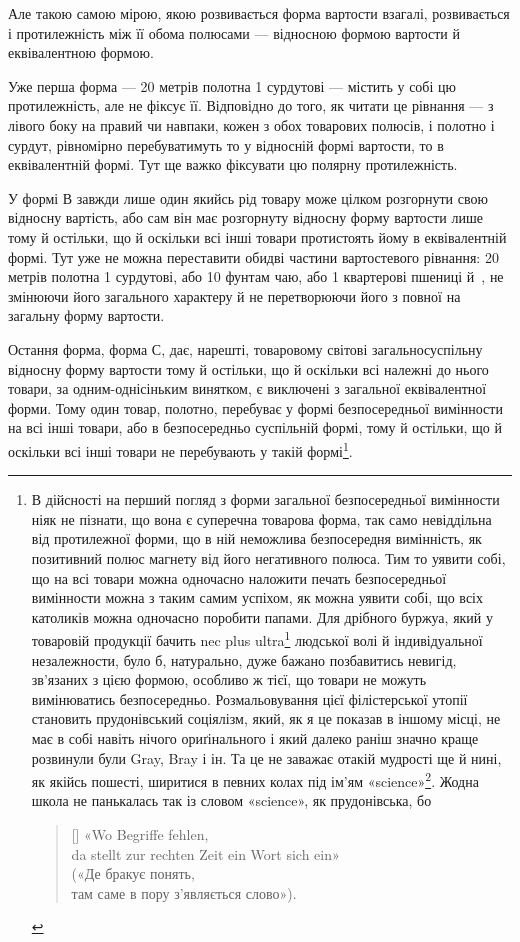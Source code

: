 Але такою самою мірою, якою розвивається форма вартости
взагалі, розвивається і протилежність між її обома полюсами —
відносною формою вартости й еквівалентною формою.

Уже перша форма — 20 метрів полотна \deq{} 1 сурдутові —
містить у собі цю протилежність, але не фіксує її. Відповідно до
того, як читати це рівнання — з лівого боку на правий чи навпаки,
кожен з обох товарових полюсів, і полотно і сурдут, рівномірно
перебуватимуть то у відносній формі вартости, то в еквівалентній
формі. Тут ще важко фіксувати цю полярну протилежність.

У формі В завжди лише один якийсь рід товару може цілком
розгорнути свою відносну вартість, або сам він має розгорнуту
відносну форму вартости лише тому й остільки, що й оскільки
всі інші товари протистоять йому в еквівалентній формі. Тут уже
не можна переставити обидві частини вартостевого рівнання: 20 метрів
полотна \deq{} 1 сурдутові, або \deq{} 10 фунтам чаю, або \deq{} 1 квартерові
пшениці й~, не змінюючи його загального характеру
й не перетворюючи його з повної на загальну форму вартости.

Остання форма, форма С, дає, нарешті, товаровому світові
загальносуспільну відносну форму вартости тому й остільки,
що й оскільки всі належні до нього товари, за одним-однісіньким
винятком, є виключені з загальної еквівалентної форми. Тому
один товар, полотно, перебуває у формі безпосередньої вимінности
на всі інші товари, або в безпосередньо суспільній формі, тому
й остільки, що й оскільки всі інші товари не перебувають у такій
формі\footnote{
В дійсності на перший погляд з форми загальної безпосередньої
вимінности ніяк не пізнати, що вона є суперечна товарова форма, так
само невіддільна від протилежної форми, що в ній неможлива безпосередня
вимінність, як позитивний полюс магнету від його негативного полюса.
Тим то уявити собі, що на всі товари можна одночасно наложити печать
безпосередньої вимінности можна з таким самим успіхом, як можна
уявити собі, що всіх католиків можна одночасно поробити папами. Для
дрібного буржуа, який у товаровій продукції бачить nec plus ultra\footnote*{
вершину. \emph{Ред}} людської волі й індивідуальної незалежности, було б, натурально, дуже
бажано позбавитись невигід, зв’язаних з цією формою, особливо ж тієї, що
товари не можуть вимінюватись безпосередньо. Розмальовування цієї філістерської
утопії становить прудонівський соціялізм, який, як я це показав
в іншому місці, не має в собі навіть нічого ориґінального і який далеко
раніш значно краще розвинули були Gray, Bray і ін. Та це не заважає
отакій мудрості ще й нині, як якійсь пошесті, ширитися в певних колах
під ім’ям «science»\footnote*{«наука». \emph{Ред.}}.
Жодна школа не панькалась так із словом «science», як прудонівська, бо
\settowidth{\versewidth}{da stellt zur rechten Zeit ein Wort sich ein»}
\begin{verse}[\versewidth]
«Wo Begriffe fehlen,\\
da stellt zur rechten Zeit ein Wort sich ein»\\
\smallskip
(«Де бракує понять,\\
там саме в пору з’являється слово»).
\end{verse}}.

